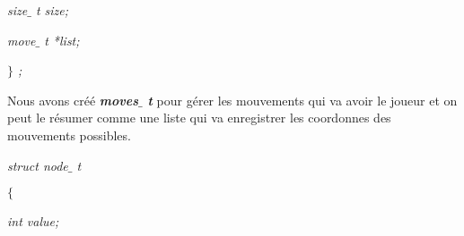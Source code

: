 \documentclass[a4paper,12pt]{article}
\begin{document}
\noindent \hspace*{0.49in}\hspace*{0.49in}\hspace*{0.49in}\hspace*{0.49in}\hspace*{0.49in}\textit{size$ \_ $ t size;}\par


\noindent \hspace*{0.49in}\hspace*{0.49in}\hspace*{0.49in}\hspace*{0.49in}\hspace*{0.49in}\textit{move$ \_ $ t *list;}\par


\noindent \hspace*{0.49in}\hspace*{0.49in}\hspace*{0.49in}\hspace*{0.49in}\textit{$ \} $ ;}\par


\noindent \begin{justify}
Nous avons créé \textbf{\textit{moves$ \_ $ t }}pour gérer les mouvements qui va avoir le joueur et on peut le résumer comme une liste qui va enregistrer les coordonnes des mouvements possibles. 
\end{justify}\par


\vspace{\baselineskip}

\noindent \begin{justify}
\hspace*{0.49in}\hspace*{0.49in}\hspace*{0.49in}\hspace*{0.49in}\textit{struct node$ \_ $ t}
\end{justify}\par


\noindent \begin{justify}
\hspace*{0.49in}\hspace*{0.49in}\hspace*{0.49in}\textit{\hspace*{0.49in}$ \{ $ }
\end{justify}\par


\noindent \begin{justify}
\hspace*{0.49in}\hspace*{0.49in}\hspace*{0.49in}\hspace*{0.49in}\hspace*{0.49in}\textit{int value;}
\end{justify}\par
\end{document}
